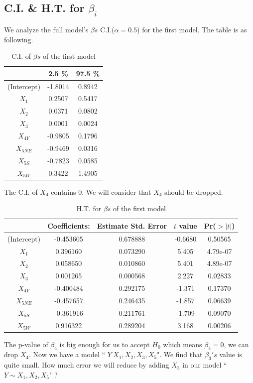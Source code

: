 \documentclass[a4paper,11pt,onecolumn,twoside]{article}
\begin{document}
\subsection{C.I. \& H.T. for $\beta_i$}
We analyze the full model's $\beta s$ C.I.($\alpha=0.5$) for the first model. The table is as following.
\begin{table}[H]
	\centering
	\begin{tabular}{ccc}
		\midrule[1.5pt]
		& 2.5 \% &97.5 \% \\
		\hline
		(Intercept) &-1.8014 &0.8942\\
		$X_1$         &  0.2507 &0.5417\\
		$X_2$           &0.0371 &0.0802\\
		$X_3$           &0.0001 &0.0024\\
		$X_{4Y}$         &-0.9805 &0.1796\\
		$X_{5NE}$        &-0.9469 &0.0316\\
		$X_{5S}$         &-0.7823 &0.0585\\
		$X_{5W}$          &0.3422 &1.4905\\	
		\midrule[1.5pt]
	\end{tabular}
	\caption{C.I. of $\beta s$ of the first model }
\end{table}
The C.I. of $X_4$ contains 0. We will consider that $X_4$ should be dropped. 
\begin{table}[H]
	\centering
	\begin{tabular}{ccccc}
		\midrule[1.5pt]	
		&Coefficients:
		&Estimate Std. Error &$t$ value &Pr($>|t|$)\\
		\hline    
	  (Intercept) &-0.453605 &  0.678888 & -0.6680 &0.50565    \\
		$X_1$          & 0.396160  & 0.073290   &5.405 &4.79e-07\\
		$X_2$          & 0.058650  & 0.010860   &5.401 &4.89e-07\\
		$X_3$          & 0.001265   &0.000568   &2.227  &0.02833 \\
		$X_{4Y}$         &-0.400484   &0.292175  &-1.371  &0.17370  \\  
		$X_{5NE}$        &-0.457657  & 0.246435  &-1.857  &0.06639 \\
		$X_{5S}$         &-0.361916   &0.211761  &-1.709  &0.09070 \\
		$X_{5W}$         & 0.916322   &0.289204   &3.168  &0.00206 \\
		\midrule[1.5pt]
	\end{tabular}
	\caption{H.T. for $\beta s$ of the first model }
\end{table}
The p-value of $\beta_4$ is big enough for us to accept $H_0$ which means $\beta_4=0$, we can drop $X_4$. Now we have a model `` $Y~X_1,X_2,X_3,X_5$". We find that $\beta_3's$ value is quite small. How much error we will reduce by adding $X_3$ in our model ``$Y\sim X_1,X_2,X_5$" ?  
\end{document}
